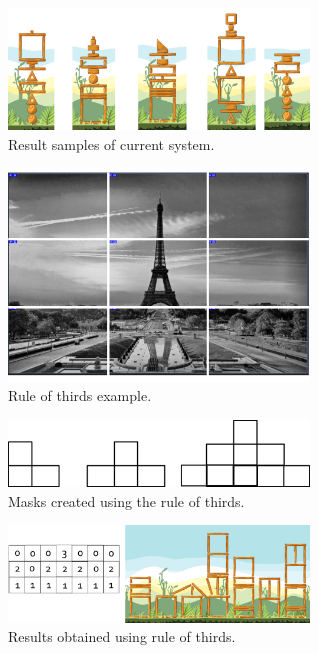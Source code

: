 \documentclass[conference]{IEEEtran}
\begin{document}
     \begin{figure}[htbp]
        \centerline{\includegraphics[width=80mm]{Images/result_example.png}}
        \caption{Result samples of current system.}
        \label{results_old}
    \end{figure}
    \begin{figure}[htbp]
        \centerline{\includegraphics[width=80mm]{Images/ruleofthirds_example.png}}
        \caption{Rule of thirds example.}
        \label{rule_of_thirds}
    \end{figure}
    \begin{figure}[htbp]
        \centerline{\includegraphics[width=80mm]{Images/mask_distribution.png}}
        \caption{Masks created using the rule of thirds.}
        \label{rule_of_thirds_masks}
    \end{figure}
    \begin{figure}[htbp]
        \centerline{\includegraphics[width=80mm]{Images/result_example_thirds.png}}
        \caption{Results obtained using rule of thirds.}
        \label{rule_of_thirds_result}
    \end{figure}
\end{document}
